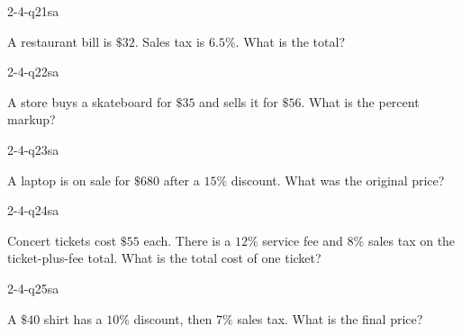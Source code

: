 \begin{practiceQuestion}{2-4-q21}{sa}
\begin{questionText}
A restaurant bill is $\$32$. Sales tax is $6.5\%$. What is the total?
\end{questionText}
\end{practiceQuestion}

\begin{practiceQuestion}{2-4-q22}{sa}
\begin{questionText}
A store buys a skateboard for $\$35$ and sells it for $\$56$. What is the percent markup?
\end{questionText}
\end{practiceQuestion}

\begin{practiceQuestion}{2-4-q23}{sa}
\begin{questionText}
A laptop is on sale for $\$680$ after a $15\%$ discount. What was the original price?
\end{questionText}
\end{practiceQuestion}

\begin{practiceQuestion}{2-4-q24}{sa}
\begin{questionText}
Concert tickets cost $\$55$ each. There is a $12\%$ service fee and $8\%$ sales tax on the ticket-plus-fee total. What is the total cost of one ticket?
\end{questionText}
\end{practiceQuestion}

\begin{practiceQuestion}{2-4-q25}{sa}
\begin{questionText}
A $\$40$ shirt has a $10\%$ discount, then $7\%$ sales tax. What is the final price?
\end{questionText}
\end{practiceQuestion}



